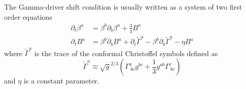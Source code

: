 \documentclass[letterpaper,nofootinbib,prd,amsmath,onecolumn]{revtex4-1}
\begin{document}
The Gamma-driver shift condition is usually written as a system of two first order equations
\begin{subequations}\label{Gamma-driver shift set}
\begin{align}
\partial_{t}\beta^{a} & = \beta^{b}\partial_{b}\beta^{a} + \frac{3}{4}B^{a}\\
\partial_{t}B^{a} & = \beta^{b}\partial_{b}B^{a} + \partial_{t}{\tilde \Gamma}^{a} - \beta^{b}\partial_{b}{\tilde \Gamma}^{a} - \eta B^{a}
\end{align}
\end{subequations}
where ${\tilde \Gamma}^{a}$ is the trace of the conformal Christoffel symbols defined as
\begin{equation}
{\tilde \Gamma}^{a} \equiv \sqrt{g}^{2/3}\left(\Gamma^{a}_{~bc}g^{bc} + \frac{1}{3}g^{ab}\Gamma^{c}_{~bc}\right)
\end{equation}
and $\eta$ is a constant parameter. 
\end{document}

